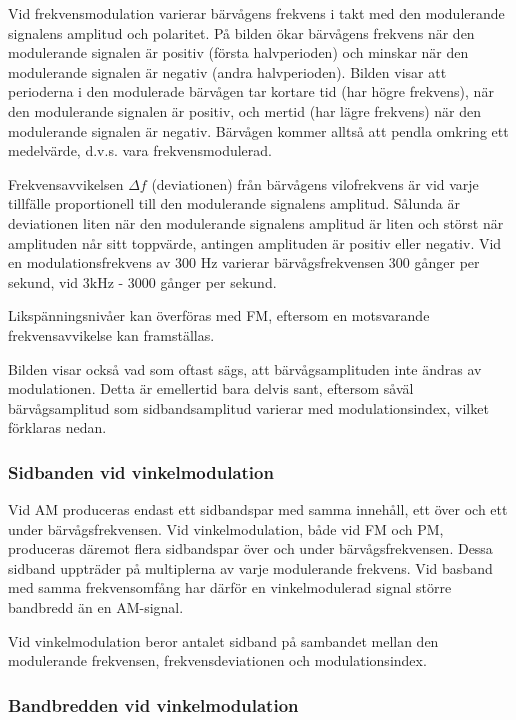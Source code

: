 Vid frekvensmodulation varierar bärvågens frekvens i takt med den modulerande
signalens amplitud och polaritet. På bilden ökar bärvågens frekvens när den
modulerande signalen är positiv (första halvperioden) och minskar när den
modulerande signalen är negativ (andra halvperioden). Bilden visar att
perioderna i den modulerade bärvågen tar kortare tid (har högre frekvens), när
den modulerande signalen är positiv, och mertid (har lägre frekvens) när den
modulerande signalen är negativ. Bärvågen kommer alltså att pendla omkring ett
medelvärde, d.v.s. vara frekvensmodulerad.

Frekvensavvikelsen \(\Delta f\) (deviationen) från bärvågens vilofrekvens är
vid varje tillfälle proportionell till den modulerande signalens amplitud.
Sålunda är deviationen liten när den modulerande signalens amplitud är liten
och störst när amplituden når sitt toppvärde, antingen amplituden är positiv
eller negativ. Vid en modulationsfrekvens av 300 Hz varierar bärvågsfrekvensen
300 gånger per sekund, vid 3kHz - 3000 gånger per sekund.

Likspänningsnivåer kan överföras med FM, eftersom en motsvarande
frekvensavvikelse kan framställas.

Bilden visar också vad som oftast sägs, att bärvågsamplituden inte ändras av
modulationen. Detta är emellertid bara delvis sant, eftersom såväl
bärvågsamplitud som sidbandsamplitud varierar med modulationsindex, vilket
förklaras nedan.

\subsubsection{Sidbanden vid vinkelmodulation}

Vid AM produceras endast ett sidbandspar med samma innehåll, ett över och ett
under bärvågsfrekvensen. Vid vinkelmodulation, både vid FM och PM, produceras
däremot flera sidbandspar över och under bärvågsfrekvensen. Dessa sidband
uppträder på multiplerna av varje modulerande frekvens. Vid basband med samma
frekvensomfång har därför en vinkelmodulerad signal större bandbredd än en
AM-signal.

Vid vinkelmodulation beror antalet sidband på sambandet mellan den modulerande
frekvensen, frekvensdeviationen och modulationsindex.

\subsubsection{Bandbredden vid vinkelmodulation}

